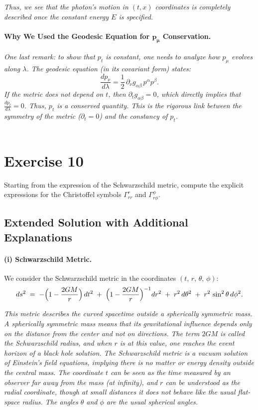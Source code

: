 \textit{Thus, we see that the photon's motion in \((t,x)\) coordinates is completely described once the constant energy \(E\) is specified.}

\paragraph{Why We Used the Geodesic Equation for \(\mathbf{p_\mu}\) Conservation.}

\textit{One last remark: to show that \(p_t\) is constant, one needs to analyze how \(p_\mu\) evolves along \(\lambda\). The geodesic equation (in its covariant form) states:}
\[
\frac{dp_\nu}{d\lambda}
= \frac12\,\partial_\nu g_{\alpha\beta}\,p^\alpha p^\beta.
\]
\textit{If the metric does not depend on \(t\), then \(\partial_t g_{\alpha\beta} = 0\), which \emph{directly} implies that \(\frac{dp_t}{d\lambda} = 0\). Thus, \(p_t\) is a conserved quantity. This is the rigorous link between the symmetry of the metric (\(\partial_t = 0\)) and the constancy of \(p_t\).}\\\\


\pagebreak

\section*{Exercise 10}

\noindent
Starting from the expression of the Schwarzschild metric, compute the explicit expressions for the Christoffel symbols \(\Gamma_{r r}^{r}\) and \(\Gamma_{r \phi}^{\phi}\).

\bigskip
\subsection*{Extended Solution with Additional Explanations}

\paragraph{(i) Schwarzschild Metric.}
We consider the Schwarzschild metric in the coordinates \((t,\,r,\,\theta,\,\phi)\):
\[
ds^2 \;=\; 
-\Bigl(1 - \frac{2GM}{r}\Bigr)\,dt^2
\;+\;
\Bigl(1 - \frac{2GM}{r}\Bigr)^{-1} dr^2
\;+\;
r^2 \, d\theta^2
\;+\;
r^2 \, \sin^2\theta \, d\phi^2.
\]

\emph{This metric describes the curved spacetime outside a spherically symmetric mass. A spherically symmetric mass means that its gravitational influence depends only on the distance from the center and not on directions. The term \(2GM\) is called the Schwarzschild radius, and when \(r\) is at this value, one reaches the event horizon of a black hole solution. The Schwarzschild metric is a vacuum solution of Einstein’s field equations, implying there is no matter or energy density outside the central mass. The coordinate \(t\) can be seen as the time measured by an observer far away from the mass (at infinity), and \(r\) can be understood as the radial coordinate, though at small distances it does not behave like the usual flat-space radius. The angles \(\theta\) and \(\phi\) are the usual spherical angles.}

